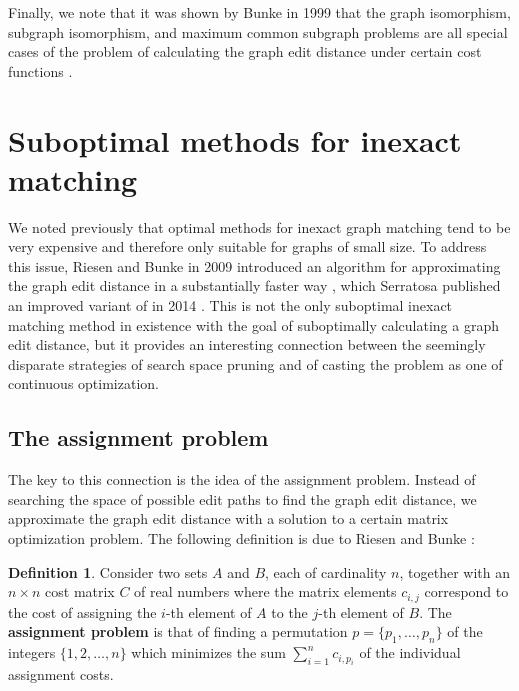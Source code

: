 \documentclass[12pt]{thesis}
\theoremstyle{plain}
\theoremstyle{definition}
\newtheorem{definition}[theorem]{Definition}
\theoremstyle{remark}
\begin{document}
Finally, we note that it was shown by Bunke in 1999 that the graph isomorphism, subgraph isomorphism, and maximum common subgraph problems are all special cases of the problem of calculating the graph edit distance under certain cost functions \cite{Bunke_1999}. 








\section{Suboptimal methods for inexact matching}

We noted previously that optimal methods for inexact graph matching tend to be very expensive and therefore only suitable for graphs of small size. To address this issue, Riesen and Bunke in 2009 introduced an algorithm for approximating the graph edit distance in a substantially faster way \cite{Riesen_2009}, which Serratosa published an improved variant of in 2014 \cite{Serratosa_2014}. This is not the only suboptimal inexact matching method in existence with the goal of suboptimally calculating a graph edit distance, but it provides an interesting connection between the seemingly disparate strategies of search space pruning and of casting the problem as one of continuous optimization.

\subsection{The assignment problem}

The key to this connection is the idea of the assignment problem. Instead of searching the space of possible edit paths to find the graph edit distance, we approximate the graph edit distance with a solution to a certain matrix optimization problem. The following definition is due to Riesen and Bunke \cite{Riesen_2009}:

\begin{definition}
Consider two sets $A$ and $B$, each of cardinality $n$, together with an $n\times n$ cost matrix $C$ of real numbers where the matrix elements $c_{i,j}$ correspond to the cost of assigning the $i$-th element of $A$ to the $j$-th element of $B$. The \textbf{assignment problem} is that of finding a permutation $p=\{p_1,\dots,p_n\}$ of the integers $\{1,2,\dots,n\}$ which minimizes the sum $\sum_{i=1}^n c_{i,p_i}$ of the individual assignment costs.
\end{definition}
\end{document}
